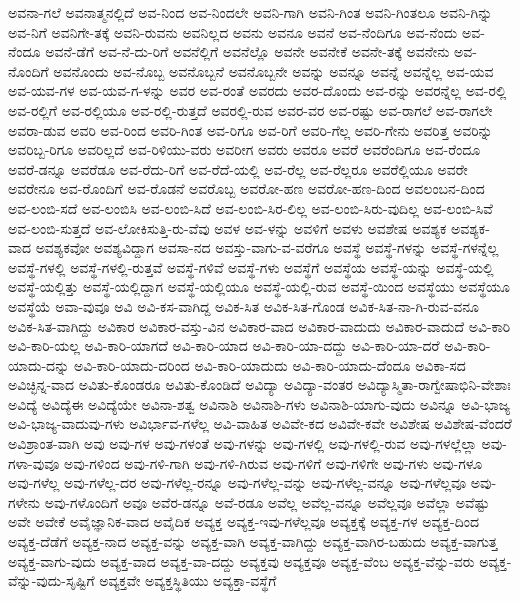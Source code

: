 {ಅವನಾ-ಗಲೆ
ಅವನಾತ್ಮನಲ್ಲಿದೆ
ಅವ-ನಿಂದ
ಅವ-ನಿಂದಲೇ
ಅವನಿ-ಗಾಗಿ
ಅವನಿ-ಗಿಂತ
ಅವನಿ-ಗಿಂತಲೂ
ಅವನಿ-ಗಿನ್ನು
ಅವ-ನಿಗೆ
ಅವನಿಗೇ-ತಕ್ಕೆ
ಅವನಿ-ರುವನು
ಅವನಿಲ್ಲದ
ಅವನು
ಅವನೂ
ಅವನೆ
ಅವ-ನೆಂದಿಗೂ
ಅವ-ನೆಂದು
ಅವ-ನೆಂದೂ
ಅವನೆ-ಡೆಗೆ
ಅವ-ನೆ-ದು-ರಿಗೆ
ಅವನೆಲ್ಲಿಗೆ
ಅವನೆಲ್ಲೊ
ಅವನೇ
ಅವನೇಕೆ
ಅವನೇ-ತಕ್ಕೆ
ಅವನೇನು
ಅವ-ನೊಂದಿಗೆ
ಅವನೊಂದು
ಅವ-ನೊಬ್ಬ
ಅವನೊಬ್ಬನೆ
ಅವನೊಬ್ಬನೇ
ಅವನ್ನು
ಅವನ್ನೂ
ಅವನ್ನೆ
ಅವನ್ನೆಲ್ಲ
ಅವ-ಯವ
ಅವ-ಯವ-ಗಳ
ಅವ-ಯವ-ಗ-ಳನ್ನು
ಅವರ
ಅವ-ರಂತೆ
ಅವರದು
ಅವರ-ದೊಂದು
ಅವ-ರನ್ನು
ಅವರನ್ನೆಲ್ಲ
ಅವ-ರಲ್ಲಿ
ಅವ-ರಲ್ಲಿಗೆ
ಅವ-ರಲ್ಲಿಯೂ
ಅವ-ರಲ್ಲಿ-ರುತ್ತದೆ
ಅವರಲ್ಲಿ-ರುವ
ಅವರ-ವರ
ಅವ-ರಷ್ಟು
ಅವ-ರಾಗಲೆ
ಅವ-ರಾಗಲೇ
ಅವರಾ-ಡುವ
ಅವರಿ
ಅವ-ರಿಂದ
ಅವರಿ-ಗಿಂತ
ಅವ-ರಿಗೂ
ಅವ-ರಿಗೆ
ಅವರಿ-ಗೆಲ್ಲ
ಅವರಿ-ಗೇನು
ಅವರಿತ್ತ
ಅವರಿನ್ನು
ಅವರಿಬ್ಬ-ರಿಗೂ
ಅವರಿಲ್ಲದೆ
ಅವ-ರಿಳಿಯು-ವರು
ಅವರೀಗ
ಅವರು
ಅವರೂ
ಅವರೆ
ಅವರೆಂದಿಗೂ
ಅವ-ರೆಂದೂ
ಅವರೆ-ಡನ್ನೂ
ಅವರೆಡೂ
ಅವ-ರೆದು-ರಿಗೆ
ಅವ-ರೆದೆ-ಯಲ್ಲಿ
ಅವ-ರೆಲ್ಲ
ಅವ-ರೆಲ್ಲರೂ
ಅವರೆಲ್ಲಿಯೂ
ಅವರೇ
ಅವರೇನೂ
ಅವ-ರೊಂದಿಗೆ
ಅವ-ರೊಡನೆ
ಅವರೊಬ್ಬ
ಅವರೋ-ಹಣ
ಅವರೋ-ಹಣ-ದಿಂದ
ಅವಲಂಬನ-ದಿಂದ
ಅವ-ಲಂಬಿ-ಸದೆ
ಅವ-ಲಂಬಿಸಿ
ಅವ-ಲಂಬಿ-ಸಿದೆ
ಅವ-ಲಂಬಿ-ಸಿರ-ಲಿಲ್ಲ
ಅವ-ಲಂಬಿ-ಸಿರು-ವುದಿಲ್ಲ
ಅವ-ಲಂಬಿ-ಸಿವೆ
ಅವ-ಲಂಬಿ-ಸುತ್ತದೆ
ಅವ-ಲೋಕಿಸುತ್ತಿ-ರು-ವೆವು
ಅವಳ
ಅವ-ಳನ್ನು
ಅವಳಿಗೆ
ಅವಳು
ಅವಶೇಷ
ಅವಶ್ಯಕ
ಅವಶ್ಯಕ-ವಾದ
ಅವಶ್ಯಕವೋ
ಅವಶ್ಯವಿದ್ದಾಗ
ಅವಸಾ-ನದ
ಅವಸ್ತು-ವಾಗು-ವ-ವರೆಗೂ
ಅವಸ್ಥೆ
ಅವಸ್ಥೆ-ಗಳನ್ನು
ಅವಸ್ಥೆ-ಗಳನ್ನೆಲ್ಲ
ಅವಸ್ಥೆ-ಗಳಲ್ಲಿ
ಅವಸ್ಥೆ-ಗಳಲ್ಲಿ-ರುತ್ತವೆ
ಅವಸ್ಥೆ-ಗಳಿವೆ
ಅವಸ್ಥೆ-ಗಳು
ಅವಸ್ಥೆಗೆ
ಅವಸ್ಥೆಯ
ಅವಸ್ಥೆ-ಯನ್ನು
ಅವಸ್ಥೆ-ಯಲ್ಲಿ
ಅವಸ್ಥೆ-ಯಲ್ಲಿತ್ತು
ಅವಸ್ಥೆ-ಯಲ್ಲಿದ್ದಾಗ
ಅವಸ್ಥೆ-ಯಲ್ಲಿಯೂ
ಅವಸ್ಥೆ-ಯಲ್ಲಿ-ರುವ
ಅವಸ್ಥೆ-ಯಿಂದ
ಅವಸ್ಥೆಯು
ಅವಸ್ಥೆಯೂ
ಅವಸ್ಥೆಯೆ
ಅವಾ-ವುವೂ
ಅವಿ
ಅವಿ-ಕಸ-ವಾಗಿದ್ದ
ಅವಿಕ-ಸಿತ
ಅವಿಕ-ಸಿತ-ಗೊಂಡ
ಅವಿಕ-ಸಿತ-ನಾ-ಗಿ-ರುವ-ವನೂ
ಅವಿಕ-ಸಿತ-ವಾಗಿದ್ದು
ಅವಿಕಾರ
ಅವಿಕಾರ-ವಸ್ತು-ವಿನ
ಅವಿಕಾರ-ವಾದ
ಅವಿಕಾರ-ವಾದುದು
ಅವಿಕಾರ-ವಾದುದೆ
ಅವಿ-ಕಾರಿ
ಅವಿ-ಕಾರಿ-ಯಲ್ಲ
ಅವಿ-ಕಾರಿ-ಯಾಗದೆ
ಅವಿ-ಕಾರಿ-ಯಾದ
ಅವಿ-ಕಾರಿ-ಯಾ-ದದ್ದು
ಅವಿ-ಕಾರಿ-ಯಾ-ದರೆ
ಅವಿ-ಕಾರಿ-ಯಾದು-ದನ್ನು
ಅವಿ-ಕಾರಿ-ಯಾದು-ದರಿಂದ
ಅವಿ-ಕಾರಿ-ಯಾದುದು
ಅವಿ-ಕಾರಿ-ಯಾದು-ದೆಂದೂ
ಅವಿಕಾ-ಸದ
ಅವಿಚ್ಛಿನ್ನ-ವಾದ
ಅವಿತು-ಕೊಂಡರೂ
ಅವಿತು-ಕೊಂಡಿದೆ
ಅವಿದ್ಯಾ
ಅವಿದ್ಯಾ-ವಂತರ
ಅವಿದ್ಯಾಸ್ಮಿತಾ-ರಾಗ್ವೇಷಾಭಿನಿ-ವೇಶಾಃ
ಅವಿದ್ಯೆ
ಅವಿದ್ಯೆಈ
ಅವಿದ್ಯೆಯೇ
ಅವಿನಾ-ಶತ್ವ
ಅವಿನಾಶಿ
ಅವಿನಾಶಿ-ಗಳು
ಅವಿನಾಶಿ-ಯಾಗು-ವುದು
ಅವಿನ್ನೂ
ಅವಿ-ಭಾಜ್ಯ
ಅವಿ-ಭಾಜ್ಯ-ವಾದುವು-ಗಳು
ಅವಿರ್ಭಾವ-ಗಳೆಲ್ಲ
ಅವಿ-ವಾಹಿತ
ಅವಿವೇ-ಕದ
ಅವಿವೇ-ಕವೇ
ಅವಿಶೇಷ
ಅವಿಶೇಷ-ವೆಂದರೆ
ಅವಿಶ್ರಾಂತ-ವಾಗಿ
ಅವು
ಅವು-ಗಳ
ಅವು-ಗಳಂತೆ
ಅವು-ಗಳನ್ನು
ಅವು-ಗಳಲ್ಲಿ
ಅವು-ಗಳಲ್ಲಿ-ರುವ
ಅವು-ಗಳಲ್ಲೆಲ್ಲಾ
ಅವು-ಗಳಾ-ವುವೂ
ಅವು-ಗಳಿಂದ
ಅವು-ಗಳಿ-ಗಾಗಿ
ಅವು-ಗಳಿ-ಗಿರುವ
ಅವು-ಗಳಿಗೆ
ಅವು-ಗಳಿಗೇ
ಅವು-ಗಳು
ಅವು-ಗಳೂ
ಅವು-ಗಳೆಲ್ಲ
ಅವು-ಗಳೆಲ್ಲ-ದರ
ಅವು-ಗಳೆಲ್ಲ-ರನ್ನೂ
ಅವು-ಗಳೆಲ್ಲ-ವನ್ನು
ಅವು-ಗಳೆಲ್ಲ-ವನ್ನೂ
ಅವು-ಗಳೆಲ್ಲವೂ
ಅವು-ಗಳೇನು
ಅವು-ಗಳೊಂದಿಗೆ
ಅವೂ
ಅವೆರ-ಡನ್ನೂ
ಅವೆ-ರಡೂ
ಅವೆಲ್ಲ
ಅವೆಲ್ಲ-ವನ್ನೂ
ಅವೆಲ್ಲವೂ
ಅವೆಲ್ಲಾ
ಅವೆಷ್ಟು
ಅವೇ
ಅವೇಕೆ
ಅವೈಜ್ಞಾನಿಕ-ವಾದ
ಅವೈದಿಕ
ಅವ್ಯಕ್ತ
ಅವ್ಯಕ್ತ-ಇವು-ಗಳೆಲ್ಲವೂ
ಅವ್ಯಕ್ತಕ್ಕೆ
ಅವ್ಯಕ್ತ-ಗಳ
ಅವ್ಯಕ್ತ-ದಿಂದ
ಅವ್ಯಕ್ತ-ದೆಡೆಗೆ
ಅವ್ಯಕ್ತ-ನಾದ
ಅವ್ಯಕ್ತ-ವನ್ನು
ಅವ್ಯಕ್ತ-ವಾಗಿ
ಅವ್ಯಕ್ತ-ವಾಗಿದ್ದು
ಅವ್ಯಕ್ತ-ವಾಗಿರ-ಬಹುದು
ಅವ್ಯಕ್ತ-ವಾಗುತ್ತ
ಅವ್ಯಕ್ತ-ವಾಗು-ವುದು
ಅವ್ಯಕ್ತ-ವಾದ
ಅವ್ಯಕ್ತ-ವಾ-ದದ್ದು
ಅವ್ಯಕ್ತವು
ಅವ್ಯಕ್ತವೂ
ಅವ್ಯಕ್ತ-ವೆಂಬ
ಅವ್ಯಕ್ತ-ವೆನ್ನು-ವರು
ಅವ್ಯಕ್ತ-ವೆನ್ನು-ವುದು-ಸೃಷ್ಟಿಗೆ
ಅವ್ಯಕ್ತವೇ
ಅವ್ಯಕ್ತಸ್ಥಿತಿಯು
ಅವ್ಯಕ್ತಾ-ವಸ್ಥೆಗೆ
}
